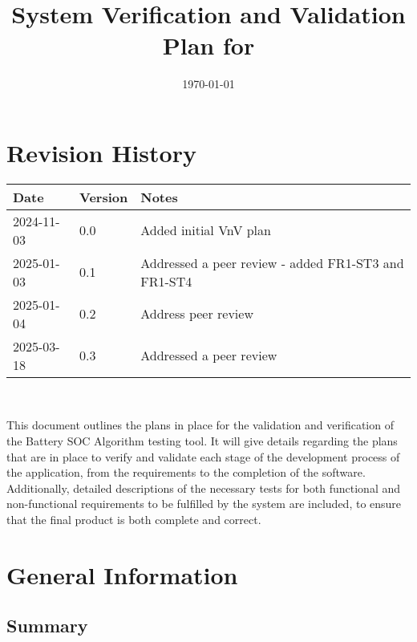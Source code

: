 \documentclass[12pt, titlepage]{article}
\begin{document}
\title{System Verification and Validation Plan for \progname{}} 
\author{\authname}
\date{\today}
	
\maketitle


\section*{Revision History}

\begin{tabularx}{\textwidth}{p{3cm}p{2cm}X}
\toprule {\bf Date} & {\bf Version} & {\bf Notes}\\
\midrule
2024-11-03 & 0.0 & Added initial VnV plan\\
\midrule
2025-01-03 & 0.1 & Addressed a peer review - added FR1-ST3 and FR1-ST4\\
\midrule
2025-01-04 & 0.2 & Address peer review\\
\midrule
2025-03-18 & 0.3 & Addressed a peer review\\
\bottomrule
\end{tabularx}

~\\

\newpage

\tableofcontents

\listoftables

\newpage


This document outlines the plans in place for the validation and verification of the Battery SOC Algorithm testing tool. It will give details regarding the plans that are in place to verify and validate each stage of the development process of the application, from the requirements to the completion of the software. Additionally, detailed descriptions of the necessary tests for both functional and non-functional requirements to be fulfilled by the system are included, to ensure that the final product is both complete and correct.

\section{General Information}

\subsection{Summary}
\end{document}
